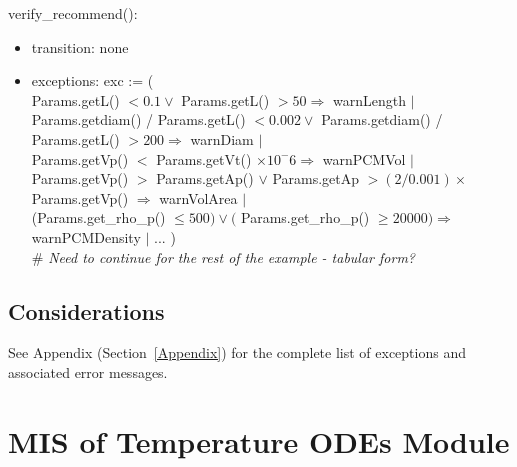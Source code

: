 \documentclass[12pt]{article}
\begin{document}
verify\_recommend():
\begin{itemize}
\item transition: none
\item exceptions: exc := (\\
Params.getL() $< 0.1 \lor$ Params.getL() $> 50 \Rightarrow$ warnLength $|$\\
Params.getdiam() / Params.getL() $< 0.002 \lor$ Params.getdiam() / Params.getL() $> 200
\Rightarrow$ warnDiam $|$\\
Params.getVp() $<$ Params.getVt() $\times 10 ^ -6 \Rightarrow$ warnPCMVol $|$\\
Params.getVp() $>$ Params.getAp() $\lor$ Params.getAp $> (2/0.001) \times$ Params.getVp()
$\Rightarrow$ warnVolArea $|$\\
(Params.get\_rho\_p() $\leq 500) \lor ($ Params.get\_rho\_p() $\geq 20000) \Rightarrow$
warnPCMDensity $|$ ... )\\
\# \textit{Need to continue for the rest of the example - tabular form?}
\end{itemize}

\subsection{Considerations}

See Appendix (Section~\ref{Appendix}) for the complete list of exceptions and
associated error messages.

\newpage
\section{MIS of Temperature ODEs Module} \label{Temperature}
\end{document}
